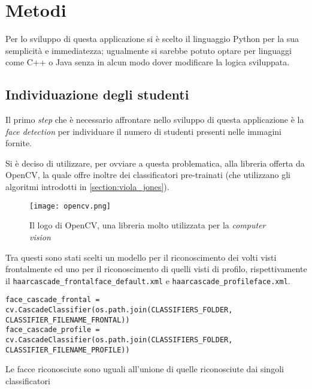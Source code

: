 \chapter{Metodi}
\label{section:methods}

Per lo sviluppo di questa applicazione si è scelto il linguaggio Python per la sua semplicità 
e immediatezza; ugualmente si sarebbe potuto optare per linguaggi come C++ o Java senza in alcun 
modo dover modificare la logica sviluppata.

\section{Individuazione degli studenti}
\label{section:methods_face_detection}

Il primo \textit{step} che è necessario affrontare nello sviluppo di questa applicazione
è la \textit{face detection} per individuare il numero di studenti presenti nelle immagini 
fornite. 

Si è deciso di utilizzare, per ovviare a questa problematica, alla libreria offerta da OpenCV, 
la quale offre inoltre dei classificatori pre-trainati (che utilizzano gli algoritmi introdotti 
in \ref{section:viola_jones}).

\begin{figure}
    \begin{small}
        \begin{center}
            \texttt{[image: opencv.png]}
        \end{center}
        \caption{Il logo di OpenCV, una libreria molto utilizzata per la \textit{computer vision} }
        \label{fig:opencv}
    \end{small}
\end{figure}

Tra questi sono stati scelti un modello per il riconoscimento dei volti visti frontalmente ed 
uno per il riconoscimento di quelli visti di profilo, rispettivamente il \lstinline{haarcascade_frontalface_default.xml} 
e \lstinline{haarcascade_profileface.xml}.

\begin{verbatim}
face_cascade_frontal = cv.CascadeClassifier(os.path.join(CLASSIFIERS_FOLDER, CLASSIFIER_FILENAME_FRONTAL))
face_cascade_profile = cv.CascadeClassifier(os.path.join(CLASSIFIERS_FOLDER, CLASSIFIER_FILENAME_PROFILE))
\end{verbatim}

Le facce riconosciute sono uguali all'unione di quelle riconosciute dai singoli classificatori

